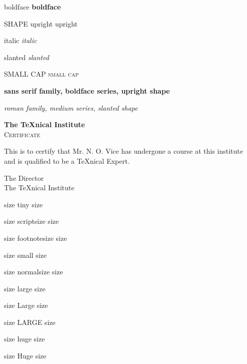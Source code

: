 \documentclass{article}
\begin{document}
boldface \textbf{boldface}

SHAPE
upright \textup{upright}

italic \textit{italic}

slanted \textsl{slanted}

SMALL CAP \textsc{small cap}


\textsf{\textbf{sans serif family, boldface series, upright shape}}

\textrm{\textsl{roman family, medium series, slanted shape}}


%


\begin{center}
{\bfseries\huge The \TeX nical Institute}\\[1cm]
{\scshape\LARGE Certificate}
\end{center}

\noindent This is to certify that Mr. N. O. Vice has undergone a
course at this institute and is qualified to be a \TeX nical Expert.
\begin{flushright}
{\sffamily The Director\\
The \TeX nical Institute}
\end{flushright}



size {\tiny tiny size} 

size {\scriptsize scriptsize size} 

size {\footnotesize footnotesize size} 

size {\small small size} 

size {\normalsize normalsize size} 

size {\large large size}

size {\Large Large size}

size {\LARGE LARGE size}

size {\huge huge size}

size {\Huge Huge size}
\end{document}
